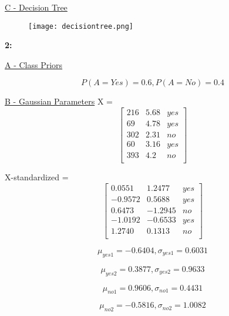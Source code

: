 \documentclass{report}
\begin{document}
\begin{flushleft}
\underline {C - Decision Tree}  \linebreak[2]

\break 

\begin{figure}
\texttt{[image: decisiontree.png]}
\end{figure}

\break

\textbf{2:} \linebreak[2]

\underline {A - Class Priors}  \linebreak[2]

\begin{equation}
P(A = Yes) = 0.6, P(A = No) = 0.4
\end{equation}

\underline {B - Gaussian Parameters}  \linebreak[2]
X  =
\[
\begin{bmatrix}
216 & 5.68 & yes \\
69 & 4.78 & yes \\
302 & 2.31 & no \\
60 & 3.16 & yes\\
393 & 4.2 & no\\
\end{bmatrix}
\] \linebreak[2]


X-standardized = 
\[
\begin{bmatrix}
0.0551	&1.2477 & yes \\
-0.9572	&0.5688 & yes \\
0.6473	&-1.2945 & no \\
-1.0192	&-0.6533 & yes \\
1.2740	&0.1313 & no \\
\end{bmatrix}
\] 

\begin{equation}
\mu_{yes1} = -0.6404, \sigma_{yes1} = 0.6031
\end{equation}

\begin{equation}
\mu_{yes2} = 0.3877, \sigma_{yes2} = 0.9633
\end{equation}

\begin{equation}
\mu_{no1} = 0.9606, \sigma_{no1} = 0.4431
\end{equation}

\begin{equation}
\mu_{no2} = -0.5816, \sigma_{no2} = 1.0082
\end{equation}


\end{flushleft}
\end{document}
